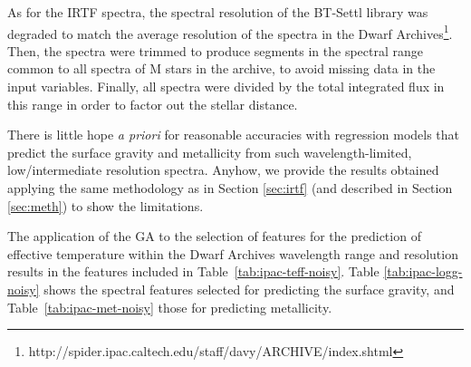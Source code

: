 
As for the IRTF spectra, the spectral resolution of the BT-Settl
library was degraded to match the average resolution of the spectra in
the Dwarf
Archives\footnote{http://spider.ipac.caltech.edu/staff/davy/ARCHIVE/index.shtml}. Then,
the spectra were trimmed to produce segments in the spectral range
common to all spectra of M stars in the archive, to avoid missing data
in the input variables. Finally, all spectra were divided by the total
integrated flux in this range in order to factor out the stellar
distance.

There is little hope {\it a priori} for reasonable accuracies with
regression models that predict the surface gravity and metallicity
from such wavelength-limited, low/intermediate resolution
spectra. Anyhow, we provide the results obtained applying the same
methodology as in Section \ref{sec:irtf} (and described in
Section \ref{sec:meth}) to show the limitations.

The application of the GA to the selection of features for the
prediction of effective temperature within the Dwarf Archives
wavelength range and resolution results in the features included in
Table~\ref{tab:ipac-teff-noisy}. Table \ref{tab:ipac-logg-noisy} shows
the spectral features selected for predicting the surface gravity, and
Table~\ref{tab:ipac-met-noisy} those for predicting metallicity.

